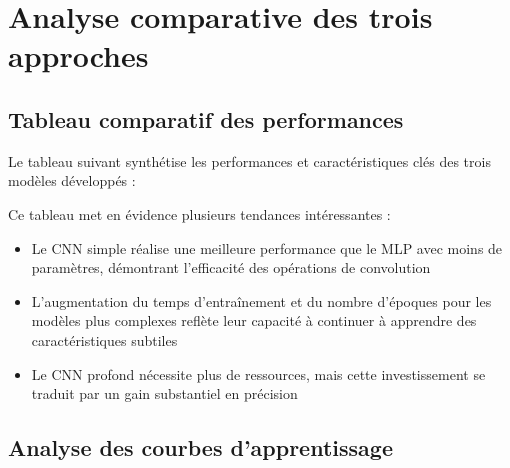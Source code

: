 \section{Analyse comparative des trois approches}
\subsection{Tableau comparatif des performances}

\begin{flushleft}
Le tableau suivant synthétise les performances et caractéristiques clés des trois modèles développés :
\end{flushleft}

\begin{table}[H]
\caption{Tableau comparatif des performances}
\label{tab:comparaison}
\end{table}

\bigskip

\begin{flushleft}
Ce tableau met en évidence plusieurs tendances intéressantes :

\begin{itemize}
\item Le CNN simple réalise une meilleure performance que le MLP avec moins de paramètres, démontrant l'efficacité des opérations de convolution
\item L'augmentation du temps d'entraînement et du nombre d'époques pour les modèles plus complexes reflète leur capacité à continuer à apprendre des caractéristiques subtiles
\item Le CNN profond nécessite plus de ressources, mais cette investissement se traduit par un gain substantiel en précision
\end{itemize}
\end{flushleft}

\subsection{Analyse des courbes d'apprentissage}


